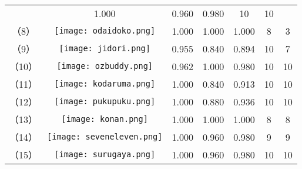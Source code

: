 \begin{table}[t]
\begin{center}
\begin{tabular}{cc|ccc|cc}
\begin{minipage}{40mm}
        \end{minipage} & 
        1.000 & 0.960 & 0.980 & %
        10 & 10 \\
        （8） & 
        \begin{minipage}{40mm}
          \centering
          \texttt{[image: odaidoko.png]}
        \end{minipage} & 
        1.000 & 1.000 & 1.000 & %
        8 & 3 \\
        （9） & 
        \begin{minipage}{40mm}
          \centering
          \texttt{[image: jidori.png]}
        \end{minipage} & 
        0.955 & 0.840 & 0.894 & %
        10 & 7 \\
        （10） & 
        \begin{minipage}{40mm}
          \centering
          \texttt{[image: ozbuddy.png]}
        \end{minipage} & 
        0.962 & 1.000 & 0.980 & %
        10 & 10 \\
        （11） &
        \begin{minipage}{40mm}
          \centering
          \texttt{[image: kodaruma.png]}
        \end{minipage} & 
        1.000 & 0.840 & 0.913 & %
        10 & 10 \\
        （12） & 
        \begin{minipage}{40mm}
          \centering
          \texttt{[image: pukupuku.png]}
        \end{minipage} & 
        1.000 & 0.880 & 0.936 & %
        10 & 10 \\
        （13） & 
        \begin{minipage}{40mm}
          \centering
          \texttt{[image: konan.png]}
        \end{minipage} & 
        1.000 & 1.000 & 1.000 & %
        8 & 8 \\
        （14） & 
        \begin{minipage}{40mm}
          \centering
          \texttt{[image: seveneleven.png]}
        \end{minipage} & 
        1.000 & 0.960 & 0.980 & %
        9 & 9 \\
        （15） & 
        \begin{minipage}{40mm}
          \centering
          \texttt{[image: surugaya.png]}
        \end{minipage} & 
        1.000 & 0.960 & 0.980 & %
        10 & 10 \\
        \hline
      \end{tabular}
    \end{center}
  \end{table}

